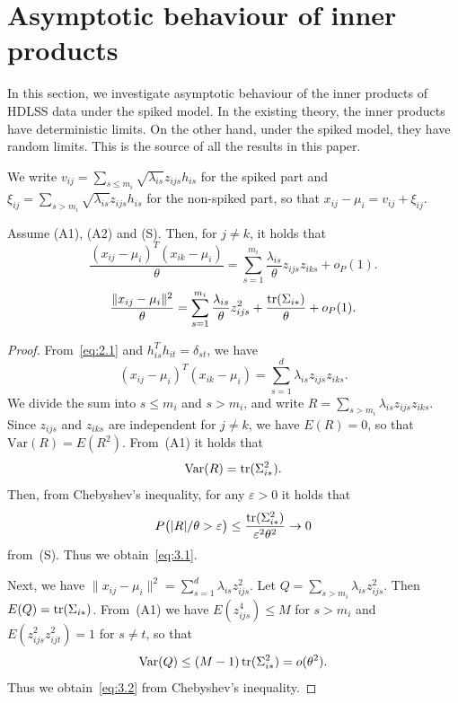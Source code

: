 \section{Asymptotic behaviour of inner products}
\label{sec:inner}

In this section, we investigate asymptotic behaviour of the inner products of HDLSS
data under the spiked model. In the existing theory, the inner products have
deterministic limits. On the other hand, under the spiked model, they have random
limits. This is the source of all the results in this paper.

We write $v_{ij}=\sum_{s\le m_i}\sqrt{\lambda_{is}}z_{ijs}h_{is}$ for the spiked
part and $\xi_{ij}=\sum_{s>m_i}\sqrt{\lambda_{is}}z_{ijs}h_{is}$ for the
non-spiked part, so that $x_{ij}-\mu_i=v_{ij}+\xi_{ij}$.

\begin{lemma}
\label{lem:1}
Assume \textup{(A1)}, \textup{(A2)} and \textup{(S)}. Then, for $j\neq k$, it holds
that
\begin{equation}
\frac{(x_{ij}-\mu_i)^T(x_{ik}-\mu_i)}{\theta}
=\sum_{s=1}^{m_i}\frac{\lambda_{is}}{\theta}z_{ijs}z_{iks}+o_P(1).
\label{eq:3.1}
\end{equation}
\begin{equation}
\frac{\|x_{ij}-\mu_i\|^2}{\theta}
=\sum_{s=1}^{m_i}\frac{\lambda_{is}}{\theta}z_{ijs}^2+\frac{\operatorname{tr}(\Sigma_{i*})}{\theta}+o_P(1).
\label{eq:3.2}
\end{equation}
\end{lemma}

\begin{proof}
From~\eqref{eq:2.1} and $h_{is}^T h_{it}=\delta_{st}$, we have
\[
(x_{ij}-\mu_i)^T(x_{ik}-\mu_i)=\sum_{s=1}^d\lambda_{is}z_{ijs}z_{iks}.
\]
We divide the sum into $s\le m_i$ and $s>m_i$, and write
$R=\sum_{s>m_i}\lambda_{is}z_{ijs}z_{iks}$. Since $z_{ijs}$ and $z_{iks}$ are
independent for $j\neq k$, we have $E(R)=0$, so that
$\mathrm{Var}(R)=E(R^2)$. From~(A1) it holds that
\[
\mathrm{Var}(R)=\operatorname{tr}(\Sigma_{i*}^2).
\]
Then, from Chebyshev's inequality, for any $\varepsilon>0$ it holds that
\[
P\bigl(|R|/\theta>\varepsilon\bigr)
\le\frac{\operatorname{tr}(\Sigma_{i*}^2)}{\varepsilon^2\theta^2}\to 0
\]
from~(S). Thus we obtain~\eqref{eq:3.1}.

Next, we have $\|x_{ij}-\mu_i\|^2=\sum_{s=1}^d\lambda_{is}z_{ijs}^2$. Let
$Q=\sum_{s>m_i}\lambda_{is}z_{ijs}^2$. Then $E(Q)=\operatorname{tr}(\Sigma_{i*})$. From~(A1) we
have $E(z_{ijs}^4)\le M$ for $s>m_i$ and $E(z_{ijs}^2 z_{ijt}^2)=1$ for $s\neq t$,
so that
\[
\mathrm{Var}(Q)\le(M-1)\operatorname{tr}(\Sigma_{i*}^2)=o(\theta^2).
\]
Thus we obtain~\eqref{eq:3.2} from Chebyshev's inequality.
\end{proof}

